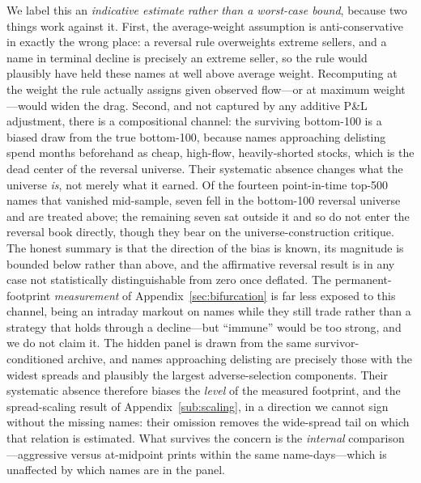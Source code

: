\documentclass[11pt]{article}
\begin{document}
We label this an \emph{indicative estimate rather than a worst-case bound}, because two things work against it. First, the average-weight assumption is anti-conservative in exactly the wrong place: a reversal rule overweights extreme sellers, and a name in terminal decline is precisely an extreme seller, so the rule would plausibly have held these names at well above average weight. Recomputing at the weight the rule actually assigns given observed flow---or at maximum weight---would widen the drag. Second, and not captured by any additive P\&L adjustment, there is a compositional channel: the surviving bottom-100 is a biased draw from the true bottom-100, because names approaching delisting spend months beforehand as cheap, high-flow, heavily-shorted stocks, which is the dead center of the reversal universe. Their systematic absence changes what the universe \emph{is}, not merely what it earned. Of the fourteen point-in-time top-500 names that vanished mid-sample, seven fell in the bottom-100 reversal universe and are treated above; the remaining seven sat outside it and so do not enter the reversal book directly, though they bear on the universe-construction critique. The honest summary is that the direction of the bias is known, its magnitude is bounded below rather than above, and the affirmative reversal result is in any case not statistically distinguishable from zero once deflated. The permanent-footprint \emph{measurement} of Appendix~\ref{sec:bifurcation} is far less exposed to this channel, being an intraday markout on names while they still trade rather than a strategy that holds through a decline---but ``immune'' would be too strong, and we do not claim it. The hidden panel is drawn from the same survivor-conditioned archive, and names approaching delisting are precisely those with the widest spreads and plausibly the largest adverse-selection components. Their systematic absence therefore biases the \emph{level} of the measured footprint, and the spread-scaling result of Appendix~\ref{sub:scaling}, in a direction we cannot sign without the missing names: their omission removes the wide-spread tail on which that relation is estimated. What survives the concern is the \emph{internal} comparison---aggressive versus at-midpoint prints within the same name-days---which is unaffected by which names are in the panel.
\end{document}
